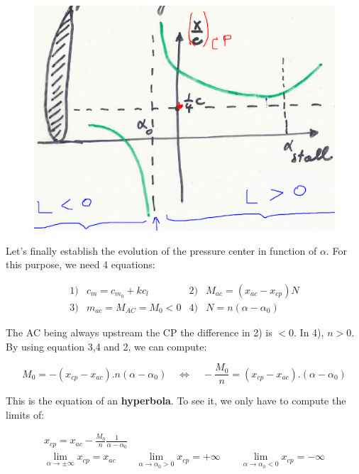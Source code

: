 			\begin{figure}
			\vspace{-5mm}
			\includegraphics[scale=0.2]{ch2/17}
			\end{figure}
			Let's finally establish the evolution of the pressure center in function of $\alpha$. For this purpose, we need 4 equations:
			
			\begin{equation}
			\begin{array}{cccc}
			1) & c_m = c_{m_0} + kc_l & 2)& M_{ac} = (x_{ac}-x_{cp})N \\
			3) & m_{ac} = M_{AC} = M_0 <0 & 4) & N = n(\alpha-\alpha _0)
			\end{array}
			\end{equation}
		
		 	The AC being always upstream the CP the difference in 2) is $<0$. In 4), $n>0$. By using equation 3,4 and 2, we can compute:
		 	
		 	\begin{equation}
		 	M_0 = -(x_{cp}-x_{ac}).n(\alpha - \alpha _0) \quad \Leftrightarrow \quad -\frac{M_0}{n} = (x_{cp}-x_{ac}).(\alpha - \alpha _0)
		 	\end{equation}
		 	
		 	This is the equation of an \textbf{hyperbola}. To see it, we only have to compute the limits of:
		 	
		 	\begin{equation}
		 	\begin{array}{c}
		 	x_{cp} = x_{ac} - \frac{M_0}{n}\frac{1}{\alpha - \alpha _0}\\
		 	\lim _{\alpha \rightarrow \pm\infty} x_{cp} = x_{ac} \qquad \lim _{\alpha \rightarrow \alpha _0 >0} x_{cp} = +\infty \qquad \lim _{\alpha \rightarrow \alpha _0 <0} x_{cp} = -\infty
		 	\end{array}
		 	\end{equation}
		 	

